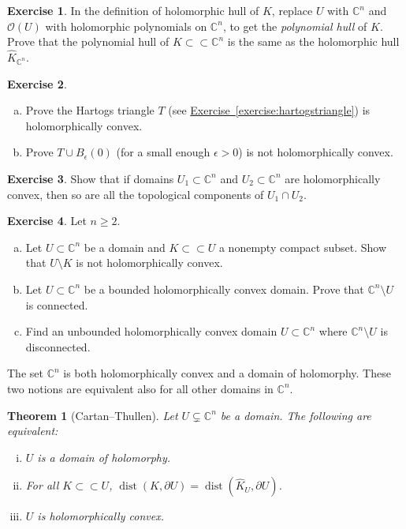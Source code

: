 \documentclass[12pt,openany]{book}
\newcommand{\C}{{\mathbb{C}}}
\newcommand{\sO}{{\mathscr{O}}}
\newcommand{\myindex}[1]{#1\index{#1}}
\theoremstyle{plain}
\newtheorem{thm}{Theorem}[section]
\theoremstyle{remark}
\theoremstyle{definition}
\newenvironment{exbox}{%
    \def\FrameCommand{\vrule width 1pt \relax\hspace{10pt}}%
    \MakeFramed{\advance\hsize-\width\FrameRestore}%
}{%
    \endMakeFramed
}
\newenvironment{exparts}{%
    \leavevmode\begin{enumerate}[a),noitemsep,topsep=0pt,parsep=0pt,partopsep=0pt]
}{%
    \end{enumerate}
}
\theoremstyle{exercise}
\newtheorem{exercise}{Exercise}[section]
\theoremstyle{example}
\newcommand{\exerciseref}[1]{\hyperref[#1]{Exercise~\ref*{#1}}}
\begin{document}
\begin{exbox}
\begin{exercise}
In the definition of holomorphic hull of $K$, replace $U$ with $\C^n$
and $\sO(U)$ with holomorphic polynomials on $\C^n$, to get the
\emph{\myindex{polynomial hull}} of $K$.  Prove that the polynomial hull of
$K \subset \subset \C^n$ is the same as the holomorphic hull $\widehat{K}_{\C^n}$.
\end{exercise}

\begin{exercise}
\begin{exparts}
\item Prove the Hartogs triangle $T$ (see \exerciseref{exercise:hartogstriangle})
is holomorphically convex.
\item Prove $T \cup B_{\epsilon}(0)$ (for a small enough $\epsilon > 0$) is
not holomorphically convex.
\end{exparts}
\end{exercise}

\begin{exercise}
Show that if domains $U_1 \subset \C^n$ and $U_2 \subset \C^n$ are
holomorphically convex,
then so are all the topological components of $U_1 \cap U_2$.
\end{exercise}

\begin{exercise}
\pagebreak[2]
Let $n \geq 2$.
\begin{exparts}
\item
Let $U \subset \C^n$ be a domain and $K \subset \subset U$
a nonempty compact subset.  Show that $U \setminus K$ is not
holomorphically convex.
\item
Let $U \subset \C^n$ be a bounded holomorphically
convex domain.  Prove that $\C^n \setminus U$ is connected.
\item
Find an unbounded holomorphically convex domain $U \subset \C^n$ where
$\C^n \setminus U$ is disconnected.
\end{exparts}
\end{exercise}
\end{exbox}

The set $\C^n$ is both holomorphically convex and
a domain of holomorphy.  These two notions are equivalent also for all
other domains in $\C^n$.

\begin{thm}[Cartan--Thullen]
\pagebreak[2]
\label{thm:cartthul}
Let $U \subsetneq \C^n$ be a domain.  The following are equivalent:
\begin{enumerate}[(i)]
\item \label{thm:cartthul:domhol}
$U$ is a domain of holomorphy.
\item \label{thm:cartthul:disthull}
For all $K \subset \subset U$,
$\operatorname{dist}(K,\partial U) = \operatorname{dist}(\widehat{K}_U,\partial U)$.
\item \label{thm:cartthul:holconv}
$U$ is holomorphically convex.
\end{enumerate}
\end{thm}
\end{document}
